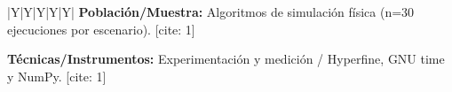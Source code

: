 \begin{landscape}
\begin{tabularx}{\linewidth}{|Y|Y|Y|Y|Y|}
\textbf{Población/Muestra:} \newline
Algoritmos de simulación física (n=30 ejecuciones por escenario). [cite: 1] \newline

\textbf{Técnicas/Instrumentos:} \newline
Experimentación y medición / Hyperfine, GNU time y NumPy. [cite: 1] \\ \hline
\end{tabularx}
\end{landscape}